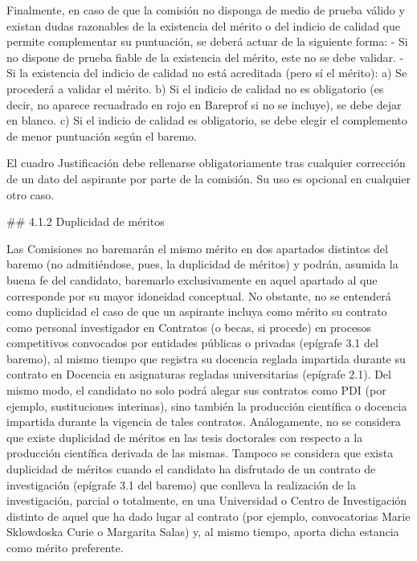 \documentclass{article}
\begin{document}
\begin{itemize}
\begin{itemize}
\begin{scriptsize}
                  Finalmente, en caso de que la comisión no disponga de medio de prueba válido y existan dudas razonables de la existencia del mérito o del indicio de calidad que permite complementar su puntuación, se deberá actuar de la siguiente forma:
                  - Si no dispone de prueba fiable de la existencia del mérito, este no se debe validar.
                  - Si la existencia del indicio de calidad no está acreditada (pero sí el mérito):
                  a) Se procederá a validar el mérito.
                  b) Si el indicio de calidad no es obligatorio (es decir, no aparece recuadrado en rojo en Bareprof si no se incluye), se debe dejar en blanco.
                  c) Si el indicio de calidad es obligatorio, se debe elegir el complemento de menor puntuación según el baremo.

                  El cuadro Justificación debe rellenarse obligatoriamente tras cualquier corrección de un dato del aspirante por parte de la comisión. Su uso es opcional en cualquier otro caso.

                  \#\# 4.1.2 Duplicidad de méritos

                  Las Comisiones no baremarán el mismo mérito en dos apartados distintos del baremo (no admitiéndose, pues, la duplicidad de méritos) y podrán, asumida la buena fe del candidato, baremarlo exclusivamente en aquel apartado al que corresponde por su mayor idoneidad conceptual. No obstante, no se entenderá como duplicidad el caso de que un aspirante incluya como mérito su contrato como personal investigador en Contratos (o becas, si procede) en procesos competitivos convocados por entidades públicas o privadas (epígrafe 3.1 del baremo), al mismo tiempo que registra su docencia reglada impartida durante su contrato en Docencia en asignaturas regladas universitarias (epígrafe 2.1). Del mismo modo, el candidato no solo podrá alegar sus contratos como PDI (por ejemplo, sustituciones interinas), sino también la producción científica o docencia impartida durante la vigencia de tales contratos. Análogamente, no se considera que existe duplicidad de méritos en las tesis doctorales con respecto a la producción científica derivada de las mismas. Tampoco se considera que exista duplicidad de méritos cuando el candidato ha disfrutado de un contrato de investigación (epígrafe 3.1 del baremo) que conlleva la realización de la investigación, parcial o totalmente, en una Universidad o Centro de Investigación distinto de aquel que ha dado lugar al contrato (por ejemplo, convocatorias Marie Sklowdoska Curie o Margarita Salas) y, al mismo tiempo, aporta dicha estancia como mérito preferente.


\end{scriptsize}
\end{itemize}
\end{itemize}
\end{document}
